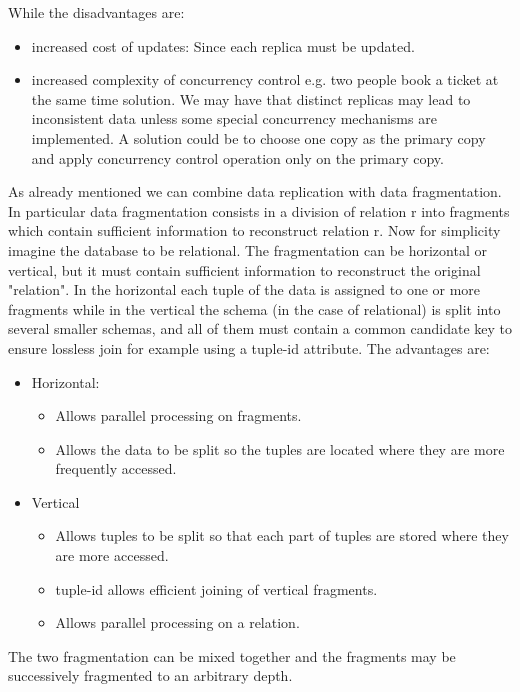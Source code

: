 \documentclass[a4page, 11pt]{article}
\begin{document}
While the disadvantages are:

\begin{itemize}[noitemsep]
	 
	\item
	increased cost of updates: Since each replica must be updated.
	\item
	increased complexity of concurrency control e.g. two people book a ticket at the same time solution. We may have that distinct replicas may lead to inconsistent data unless some special concurrency mechanisms are implemented. A solution could be to choose one copy as the primary copy and apply concurrency control operation only on the primary copy.
\end{itemize}
As already mentioned we can combine data replication with data fragmentation. In particular data fragmentation consists in a division of relation r into fragments which contain sufficient information to reconstruct relation r.
Now for simplicity imagine the database to be relational. 
The fragmentation can be horizontal or vertical, but it must contain sufficient information to reconstruct the original "relation". In the horizontal each tuple of the data is assigned to one or more fragments while in the vertical the schema (in the case of relational) is split into several smaller schemas, and all of them must contain a common candidate key to ensure lossless join for example using a tuple-id attribute.\newline
The advantages are:
\begin{itemize}[noitemsep]
	\item Horizontal:
	\begin{itemize}[noitemsep]
		\item Allows parallel processing on fragments.
		\item Allows the data to be split so the tuples are located where they are more frequently accessed.
	\end{itemize}
	\item Vertical
	\begin{itemize}[noitemsep]
		\item Allows tuples to be split so that each part of tuples are stored where they are more accessed.
		\item tuple-id allows efficient joining of vertical fragments.
		\item Allows parallel processing on a relation.
	\end{itemize}
\end{itemize}
The two fragmentation can be mixed together and the fragments may be successively fragmented to an arbitrary depth. 
\end{document}
